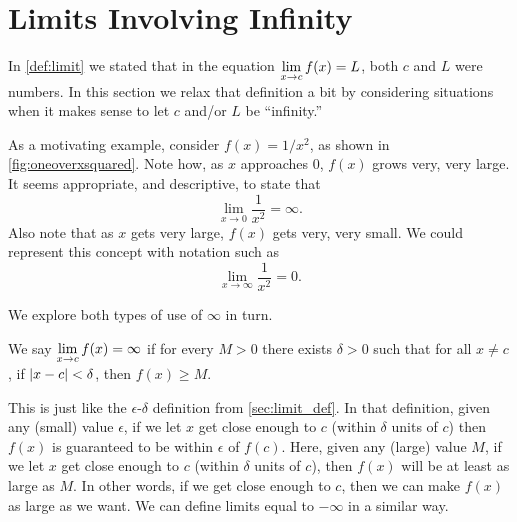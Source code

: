 \section{Limits Involving Infinity}\label{sec:limits_infty}

In \autoref{def:limit} we stated that in the equation $\displaystyle \lim_{x\to c}f(x) = L$, both $c$ and $L$ were numbers. In this section we relax that definition a bit by considering situations when it makes sense to let $c$ and/or $L$ be ``infinity.''

As a motivating example, consider $f(x) = 1/x^2$, as shown in \autoref{fig:oneoverxsquared}. Note how, as $x$ approaches 0, $f(x)$ grows very, very large. It seems appropriate, and descriptive, to state that\vspace{-.5\baselineskip}
\[\lim_{x\rightarrow 0} \frac1{x^2}=\infty.\]
Also note that as $x$ gets very large, $f(x)$ gets very, very small. We could represent this concept with notation such as\vspace{-.3\baselineskip}
\[\lim_{x\rightarrow \infty} \frac1{x^2}=0.\]


We explore both types of use of $\infty$ in turn.

\begin{definition}\label{def:limit_of_infinity}%
We say $\displaystyle \lim_{x\rightarrow c} f(x)=\infty$ if for every $M>0$ there exists $\delta>0$ such that for all $x\neq c$, if  $\left\lvert x-c \right\rvert<\delta$, then $f(x)\geq M$. 
\end{definition}

This is just like the $\epsilon$-$\delta$ definition from \autoref{sec:limit_def}.  In that definition, given any (small) value $\epsilon$, if we let $x$ get close enough to $c$ (within $\delta$ units of $c$) then $f(x)$ is guaranteed to be within $\epsilon$ of $f(c)$.  Here, given any (large) value $M$, if we let $x$ get close enough to $c$ (within $\delta$ units of $c$), then $f(x)$ will be at least as large as $M$.  In other words, if we get close enough to $c$, then we can make $f(x)$ as large as we want.  We can define limits equal to $-\infty$ in a similar way.

